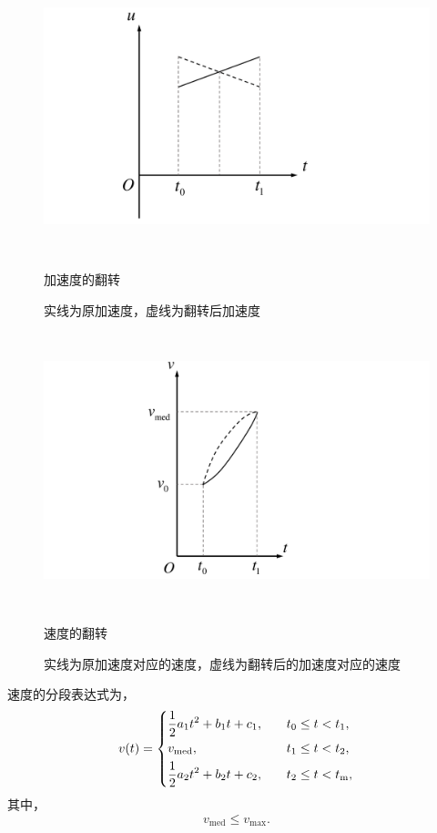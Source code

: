 \begin{figure}[htbp]
\begin{minipage}{0.50\textwidth}
  \centering
  \includegraphics[height=8cm,trim={5cm 0 9cm 0},clip]{figures/uvert.pdf}
  \caption{加速度的翻转}
  \caption*{\small 实线为原加速度，虚线为翻转后加速度}
  \caption*{}
  \label{fig:uvert}
\end{minipage}\hfill
\begin{minipage}{0.45\textwidth}
  \centering
  \includegraphics[height=8cm,trim={7cm 0 8cm 0},clip]{figures/vvert.pdf}
  \caption{速度的翻转}
  \caption*{实线为原加速度对应的速度，虚线为翻转后的加速度对应的速度}
  \label{fig:vvert}
\end{minipage}
\end{figure}

速度的分段表达式为，
\begin{equation}
v(t)=
\begin{dcases}
\frac12 a_1t^2+b_1t+c_1,\quad& t_0\leq t < t_1,\\
v_\mathrm{med}, \quad& t_1\leq t < t_2,\\
\frac12 a_2t^2+b_2t+c_2,\quad& t_2\leq t < t_\mathrm{m},
\end{dcases}
\end{equation}
其中，
\begin{equation}
v_\mathrm{med}\leq v_{\max}.
\end{equation}


